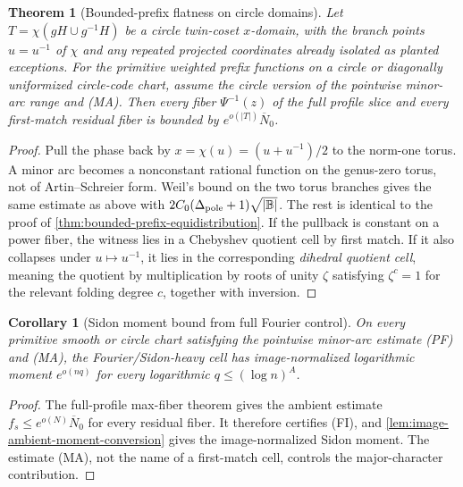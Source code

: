 \documentclass[12pt,a4paper]{amsart}
\numberwithin{equation}{section}
\newtheorem{theorem}{Theorem}[section]
\newtheorem{corollary}[corollary]{Corollary}
\theoremstyle{remark}
\newcommand{\B}{\mathbb B}
\newcommand{\barN}{\overline N}
\newcommand{\abs}[1]{\lvert #1\rvert}
\begin{document}
\begin{theorem}[Bounded-prefix flatness on circle domains]\label{thm:circle-prefix-equidistribution}
Let \(T=\chi(gH\cup g^{-1}H)\) be a circle twin-coset \(x\)-domain, with
the branch points \(u=u^{-1}\) of \(\chi\) and any repeated projected
coordinates already isolated as planted exceptions.  For the primitive weighted
prefix functions on a circle or diagonally uniformized circle-code chart,
assume the circle version of the pointwise minor-arc range and
\textup{(MA)}.  Then every fiber \(\Psi^{-1}(z)\) of the full profile slice
and every first-match residual fiber
is bounded by \(e^{o(\abs T)}\barN_0\).
\end{theorem}

\begin{proof}
Pull the phase back by \(x=\chi(u)=(u+u^{-1})/2\) to the norm-one torus.
A minor arc becomes a nonconstant rational function on the genus-zero
torus, not of Artin--Schreier form.  Weil's bound on the two torus branches
gives the same estimate as above with
\(2C_0(\Delta_{\rm pole}+1)\sqrt{\abs\B}\).  The rest is identical to
the proof of \cref{thm:bounded-prefix-equidistribution}.  If the pullback
is constant on a power fiber, the witness lies in a Chebyshev quotient cell
by first match.  If it also collapses under \(u\mapsto u^{-1}\), it lies
in the corresponding \emph{dihedral quotient cell}, meaning the quotient
by multiplication by roots of unity \(\zeta\) satisfying \(\zeta^c=1\)
for the relevant folding degree \(c\), together with inversion.
\end{proof}

\begin{corollary}[Sidon moment bound from full Fourier control]\label{cor:fourier-sidon-paid-smooth-circle}
On every primitive smooth or circle chart satisfying the pointwise
minor-arc estimate \textup{(PF)} and \textup{(MA)}, the
Fourier/Sidon-heavy cell has image-normalized logarithmic moment
\(e^{o(nq)}\) for every logarithmic \(q\le(\log n)^A\).
\end{corollary}

\begin{proof}
The full-profile max-fiber theorem gives the ambient estimate
\(f_s\le e^{o(N)}\barN_0\) for every residual fiber.  It therefore
certifies \textup{(FI)}, and
\cref{lem:image-ambient-moment-conversion} gives the image-normalized
Sidon moment.  The estimate \textup{(MA)}, not the name of a first-match
cell, controls the major-character contribution.
\end{proof}
\end{document}
